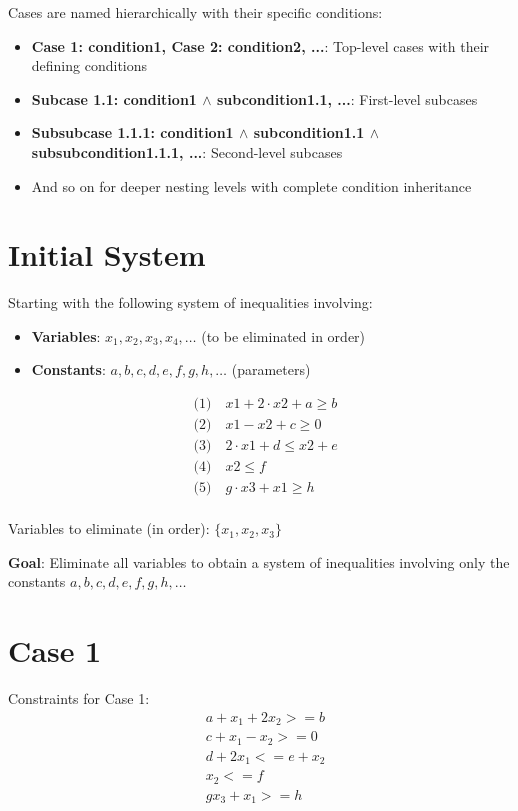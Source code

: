 \documentclass{article}
\begin{document}
Cases are named hierarchically with their specific conditions:
\begin{itemize}
\item \textbf{Case 1: condition1, Case 2: condition2, ...}: Top-level cases with their defining conditions
\item \textbf{Subcase 1.1: condition1 $\wedge$ subcondition1.1, ...}: First-level subcases
\item \textbf{Subsubcase 1.1.1: condition1 $\wedge$ subcondition1.1 $\wedge$ subsubcondition1.1.1, ...}: Second-level subcases
\item And so on for deeper nesting levels with complete condition inheritance
\end{itemize}

\section{Initial System}

Starting with the following system of inequalities involving:
\begin{itemize}
\item \textbf{Variables}: $x_1, x_2, x_3, x_4, \ldots$ (to be eliminated in order)
\item \textbf{Constants}: $a, b, c, d, e, f, g, h, \ldots$ (parameters)
\end{itemize}

\begin{align}
& \text{(1)} \quad x1 + 2 \cdot x2 + a \geq b \\
& \text{(2)} \quad x1 - x2 + c \geq 0 \\
& \text{(3)} \quad 2 \cdot x1 + d \leq x2 + e \\
& \text{(4)} \quad x2 \leq f \\
& \text{(5)} \quad g \cdot x3 + x1 \geq h \\
\end{align}

Variables to eliminate (in order): $\{x_{1}, x_{2}, x_{3}\}$

\textbf{Goal}: Eliminate all variables to obtain a system of inequalities
involving only the constants $a, b, c, d, e, f, g, h, \ldots$

\section{Case 1}

Constraints for Case 1:
\begin{align}
& a + x_{1} + 2 x_{2} >= b \\
& c + x_{1} - x_{2} >= 0 \\
& d + 2 x_{1} <= e + x_{2} \\
& x_{2} <= f \\
& g x_{3} + x_{1} >= h \\
\end{align}
\end{document}
